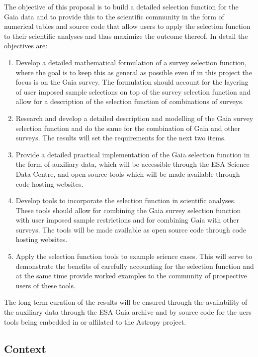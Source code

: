 The objective of this proposal is to build a detailed selection function for the Gaia data and to provide this to the
scientific community in the form of numerical tables and source code that allow users to apply the selection function to
their scientific analyses and thus maximize the outcome thereof. In detail the objectives are:

\begin{enumerate}
    \item Develop a detailed mathematical formulation of a survey selection function, where the goal is to keep this as general as possible even if in this project the focus is on the Gaia survey. The formulation should account for the layering of user imposed sample selections on top of the survey selection function and allow for a description of the selection function of combinations of surveys.
    \item Research and develop a detailed description and modelling of the Gaia survey selection function and do the same for the combination of Gaia and other surveys. The results will set the requirements for the next two items.
    \item Provide a detailed practical implementation of the Gaia selection function in the form of auxiliary data, which will be accessible through the ESA Science Data Centre, and open source tools which will be made available through code hosting websites. 
    \item Develop tools to incorporate the selection function in scientific analyses. These tools should allow for combining the Gaia survey selection function with user imposed sample restrictions and for combining Gaia with other surveys. The tools will be made available as open source code through code hosting websites.
    \item Apply the selection function tools to example science cases. This will serve to demonstrate the benefits of carefully accounting for the selection function and at the same time provide worked examples to the community of prospective users of these tools.
\end{enumerate}

The long term curation of the results will be ensured through the availability of the auxiliary data through the ESA Gaia archive and by source code for the uers tools being embedded in or affilated to the Astropy project.

\subsection{Context}
\label{sec:context}

